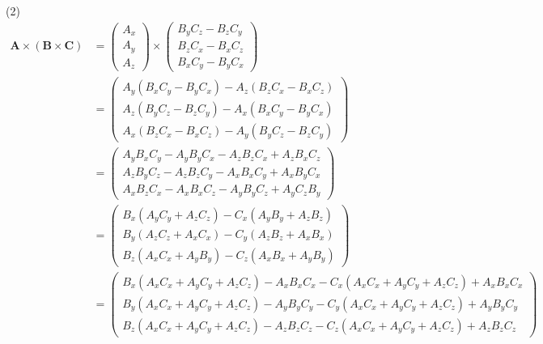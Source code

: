 \documentclass[a4paper,12pt]{jlreq}
\begin{document}
(2)
\begin{align*}
    \bm{A}\times\left(\bm{B}\times\bm{C}\right) & =\begin{pmatrix}A_x\\A_y\\A_z\end{pmatrix}\times\begin{pmatrix}B_yC_z-B_zC_y\\B_zC_x-B_xC_z\\B_xC_y-B_yC_x\end{pmatrix}                                                                                                                                                                                                  \\
                                                & =\begin{pmatrix}A_y\left(B_xC_y-B_yC_x\right)-A_z\left(B_zC_x-B_xC_z\right)\\A_z\left(B_yC_z-B_zC_y\right)-A_x\left(B_xC_y-B_yC_x\right)\\A_x\left(B_zC_x-B_xC_z\right)-A_y\left(B_yC_z-B_zC_y\right)\end{pmatrix}                                                                                                       \\
                                                & =\begin{pmatrix}A_yB_xC_y-A_yB_yC_x-A_zB_zC_x+A_zB_xC_z\\A_zB_yC_z-A_zB_zC_y-A_xB_xC_y+A_xB_yC_x\\A_xB_zC_x-A_xB_xC_z-A_yB_yC_z+A_yC_zB_y\end{pmatrix}                                                                                                                                                                   \\
                                                & =\begin{pmatrix}B_x\left(A_yC_y+A_zC_z\right)-C_x\left(A_yB_y+A_zB_z\right)\\B_y\left(A_zC_z+A_xC_x\right)-C_y\left(A_zB_z+A_xB_x\right)\\B_z\left(A_xC_x+A_yB_y\right)-C_z\left(A_xB_x+A_yB_y\right)\end{pmatrix}                                                                                                       \\
                                                & =\begin{pmatrix}B_x\left(A_xC_x+A_yC_y+A_zC_z\right)-A_xB_xC_x-C_x\left(A_xC_x+A_yC_y+A_zC_z\right)+A_xB_xC_x\\B_y\left(A_xC_x+A_yC_y+A_zC_z\right)-A_yB_yC_y-C_y\left(A_xC_x+A_yC_y+A_zC_z\right)+A_yB_yC_y\\B_z\left(A_xC_x+A_yC_y+A_zC_z\right)-A_zB_zC_z-C_z\left(A_xC_x+A_yC_y+A_zC_z\right)+A_zB_zC_z\end{pmatrix} \\

\end{align*}
\end{document}
